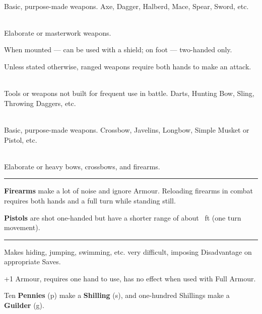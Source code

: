 \documentclass[itdr/core]{subfiles}
\begin{document}
\\
Basic, purpose-made weapons. Axe, Dagger, Halberd, Mace, Spear, Sword, etc.

\\
Elaborate or masterwork weapons.

 When mounted --- can be used with a shield; on foot --- two-handed only.

\vfill


Unless stated otherwise, ranged weapons require both hands to make an attack.

\\
Tools or weapons not built for frequent use in battle. Darts, Hunting Bow, Sling, Throwing Daggers, etc.

\\
Basic, purpose-made weapons. Crossbow, Javelins, Longbow, Simple Musket or Pistol, etc.

\\
Elaborate or heavy bows, crossbows, and firearms.

\vfill\hrule
{}
\textbf{Firearms} make a lot of noise and ignore Armour. Reloading firearms in combat requires both hands and a full turn while standing still.

\textbf{Pistols} are shot one-handed but have a shorter range of about \basemove~ft (one turn movement).
\hrule\vfill



 Makes hiding, jumping, swimming, etc. very difficult, imposing Disadvantage on appropriate Saves.\tight

 +1 Armour, requires one hand to use, has no effect when used with Full Armour.


\break


\begin{dbox}
Ten \textbf{Pennies} (p) make a \textbf{Shilling} (s), and one-hundred Shillings make a \textbf{Guilder} (g).
\end{dbox}
\end{document}
